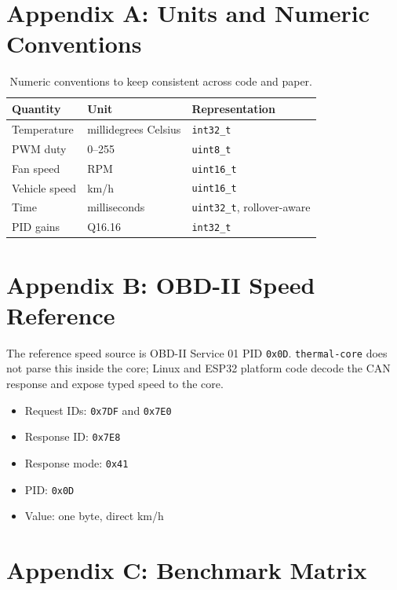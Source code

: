 \section{Appendix A: Units and Numeric Conventions}

\begin{table}[h]
\centering
\begin{tabular}{lll}
\toprule
\textbf{Quantity} & \textbf{Unit} & \textbf{Representation} \\
\midrule
Temperature & millidegrees Celsius & \texttt{int32\_t} \\
PWM duty & 0--255 & \texttt{uint8\_t} \\
Fan speed & RPM & \texttt{uint16\_t} \\
Vehicle speed & km/h & \texttt{uint16\_t} \\
Time & milliseconds & \texttt{uint32\_t}, rollover-aware \\
PID gains & Q16.16 & \texttt{int32\_t} \\
\bottomrule
\end{tabular}
\caption{Numeric conventions to keep consistent across code and paper.}
\end{table}

\section{Appendix B: OBD-II Speed Reference}

The reference speed source is OBD-II Service 01 PID \texttt{0x0D}. \texttt{thermal-core} does not parse this inside the core; Linux and ESP32 platform code decode the CAN response and expose typed speed to the core.

\begin{itemize}[leftmargin=*]
    \item Request IDs: \texttt{0x7DF} and \texttt{0x7E0}
    \item Response ID: \texttt{0x7E8}
    \item Response mode: \texttt{0x41}
    \item PID: \texttt{0x0D}
    \item Value: one byte, direct km/h
\end{itemize}

\section{Appendix C: Benchmark Matrix}

